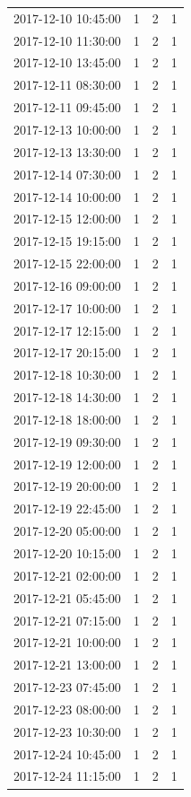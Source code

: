 \begin{tabular}{lrrr}
2017-12-10 10:45:00 & 1 & 2 & 1 \\
2017-12-10 11:30:00 & 1 & 2 & 1 \\
2017-12-10 13:45:00 & 1 & 2 & 1 \\
2017-12-11 08:30:00 & 1 & 2 & 1 \\
2017-12-11 09:45:00 & 1 & 2 & 1 \\
2017-12-13 10:00:00 & 1 & 2 & 1 \\
2017-12-13 13:30:00 & 1 & 2 & 1 \\
2017-12-14 07:30:00 & 1 & 2 & 1 \\
2017-12-14 10:00:00 & 1 & 2 & 1 \\
2017-12-15 12:00:00 & 1 & 2 & 1 \\
2017-12-15 19:15:00 & 1 & 2 & 1 \\
2017-12-15 22:00:00 & 1 & 2 & 1 \\
2017-12-16 09:00:00 & 1 & 2 & 1 \\
2017-12-17 10:00:00 & 1 & 2 & 1 \\
2017-12-17 12:15:00 & 1 & 2 & 1 \\
2017-12-17 20:15:00 & 1 & 2 & 1 \\
2017-12-18 10:30:00 & 1 & 2 & 1 \\
2017-12-18 14:30:00 & 1 & 2 & 1 \\
2017-12-18 18:00:00 & 1 & 2 & 1 \\
2017-12-19 09:30:00 & 1 & 2 & 1 \\
2017-12-19 12:00:00 & 1 & 2 & 1 \\
2017-12-19 20:00:00 & 1 & 2 & 1 \\
2017-12-19 22:45:00 & 1 & 2 & 1 \\
2017-12-20 05:00:00 & 1 & 2 & 1 \\
2017-12-20 10:15:00 & 1 & 2 & 1 \\
2017-12-21 02:00:00 & 1 & 2 & 1 \\
2017-12-21 05:45:00 & 1 & 2 & 1 \\
2017-12-21 07:15:00 & 1 & 2 & 1 \\
2017-12-21 10:00:00 & 1 & 2 & 1 \\
2017-12-21 13:00:00 & 1 & 2 & 1 \\
2017-12-23 07:45:00 & 1 & 2 & 1 \\
2017-12-23 08:00:00 & 1 & 2 & 1 \\
2017-12-23 10:30:00 & 1 & 2 & 1 \\
2017-12-24 10:45:00 & 1 & 2 & 1 \\
2017-12-24 11:15:00 & 1 & 2 & 1 \\

\end{tabular}
